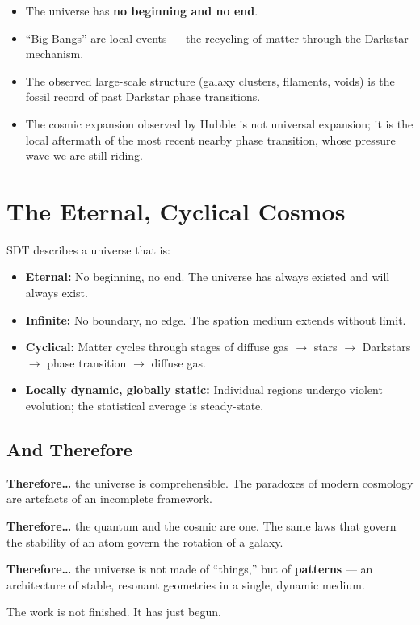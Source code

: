 \begin{itemize}
  \item The universe has \textbf{no beginning and no end}.
  \item ``Big Bangs'' are local events --- the recycling of matter through the Darkstar mechanism.
  \item The observed large-scale structure (galaxy clusters, filaments, voids) is the fossil record of past Darkstar phase transitions.
  \item The cosmic expansion observed by Hubble is not universal expansion; it is the local aftermath of the most recent nearby phase transition, whose pressure wave we are still riding.
\end{itemize}


\section{The Eternal, Cyclical Cosmos}

SDT describes a universe that is:
\begin{itemize}
  \item \textbf{Eternal:} No beginning, no end.  The universe has always existed and will always exist.
  \item \textbf{Infinite:} No boundary, no edge.  The spation medium extends without limit.
  \item \textbf{Cyclical:} Matter cycles through stages of diffuse gas $\to$ stars $\to$ Darkstars $\to$ phase transition $\to$ diffuse gas.
  \item \textbf{Locally dynamic, globally static:} Individual regions undergo violent evolution; the statistical average is steady-state.
\end{itemize}

\subsection{And Therefore}

\textbf{Therefore\ldots} the universe is comprehensible.  The paradoxes of modern cosmology are artefacts of an incomplete framework.

\textbf{Therefore\ldots} the quantum and the cosmic are one.  The same laws that govern the stability of an atom govern the rotation of a galaxy.

\textbf{Therefore\ldots} the universe is not made of ``things,'' but of \textbf{patterns} --- an architecture of stable, resonant geometries in a single, dynamic medium.

The work is not finished.  It has just begun.
